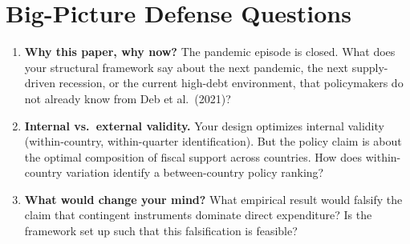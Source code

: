 \documentclass[11pt,a4paper]{article}
\begin{document}
\section{Big-Picture Defense Questions}

\begin{enumerate}
\item \textbf{Why this paper, why now?} The pandemic episode is closed. What does your structural framework say about the next pandemic, the next supply-driven recession, or the current high-debt environment, that policymakers do not already know from Deb et al.\ (2021)?

\item \textbf{Internal vs.\ external validity.} Your design optimizes internal validity (within-country, within-quarter identification). But the policy claim is about the optimal composition of fiscal support across countries. How does within-country variation identify a between-country policy ranking?

\item \textbf{What would change your mind?} What empirical result would falsify the claim that contingent instruments dominate direct expenditure? Is the framework set up such that this falsification is feasible?
\end{enumerate}
\end{document}
